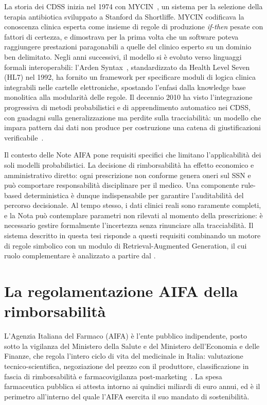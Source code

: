 La storia dei CDSS inizia nel 1974 con MYCIN~\cite{shortliffe1974mycin}, un
sistema per la selezione della terapia antibiotica sviluppato a Stanford da
Shortliffe.
MYCIN codificava la conoscenza clinica esperta come insieme di regole di produzione
\emph{if-then} pesate con fattori di certezza, e dimostrava per la prima volta che
un software poteva raggiungere prestazioni paragonabili a quelle del clinico esperto
su un dominio ben delimitato.
Negli anni successivi, il modello si è evoluto verso linguaggi formali interoperabili:
l'Arden Syntax~\cite{hripcsak1994arden}, standardizzato da Health Level Seven (HL7) nel 1992, ha fornito
un framework per specificare moduli di logica clinica integrabili nelle cartelle
elettroniche, spostando l'enfasi dalla knowledge base monolitica alla modularità
delle regole.
Il decennio 2010 ha visto l'integrazione progressiva di metodi probabilistici
e di apprendimento automatico nei CDSS, con guadagni sulla generalizzazione ma
perdite sulla tracciabilità: un modello che impara pattern dai dati non produce
per costruzione una catena di giustificazioni verificabile~\cite{sutton2020overview}.

Il contesto delle Note AIFA pone requisiti specifici che limitano l'applicabilità
dei soli modelli probabilistici.
La decisione di rimborsabilità ha effetto economico e amministrativo diretto: ogni
prescrizione non conforme genera oneri sul SSN e può comportare responsabilità
disciplinare per il medico.
Una componente rule-based deterministica è dunque indispensabile per garantire
l'auditabilità del percorso decisionale.
Al tempo stesso, i dati clinici reali sono raramente completi, e la Nota può
contemplare parametri non rilevati al momento della prescrizione: è necessario
gestire formalmente l'incertezza senza rinunciare alla tracciabilità.
Il sistema descritto in questa tesi risponde a questi requisiti combinando un
motore di regole simbolico con un modulo di Retrieval-Augmented Generation, il
cui ruolo complementare è analizzato a partire dal .

\section{La regolamentazione AIFA della rimborsabilità}
\label{sec:aifa-regolamentazione}

L'Agenzia Italiana del Farmaco (AIFA) è l'ente pubblico indipendente, posto
sotto la vigilanza del Ministero della Salute e del Ministero dell'Economia e delle
Finanze, che regola l'intero ciclo di vita del medicinale in Italia: valutazione
tecnico-scientifica, negoziazione del prezzo con il produttore, classificazione in
fascia di rimborsabilità e farmacovigilanza post-marketing~\cite{aifa2024note}.
La spesa farmaceutica pubblica si attesta intorno ai quindici miliardi di euro
annui, ed è il perimetro all'interno del quale l'AIFA esercita il suo mandato di
sostenibilità.

